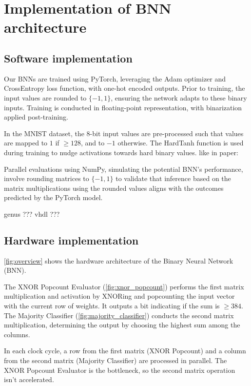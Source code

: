 \documentclass[conference]{IEEEtran}
\newcounter{todocount}
\newcommand{\todo}[1]{
  \stepcounter{todocount}
}
\begin{document}
\section{Implementation of BNN architecture}
\label{sec:implementation}
\subsection{Software implementation}
\todo{list learning rate, batch size}

Our BNNs are trained using PyTorch\cite{paszke2019pytorch}, leveraging the Adam optimizer\cite{kingma2014adam} and CrossEntropy loss function\cite{mao2023crossentropy}, with one-hot encoded outputs. Prior to training, the input values are rounded to \(\{-1, 1\}\), ensuring the network adapts to these binary inputs. Training is conducted in floating-point representation, with binarization applied post-training.

In the MNIST dataset, the 8-bit input values are pre-processed such that values are mapped to $1$ if $\geq 128$, and to $-1$ otherwise. The HardTanh function is used during training to nudge activations towards hard binary values. like in paper: \cite{yuan2023comprehensive}

Parallel evaluations using NumPy, simulating the potential BNN's performance, involve rounding matrices to \(\{-1, 1\}\) to validate that inference based on the matrix multiplications using the rounded values aligns with the outcomes predicted by the PyTorch model.


genus ??? vhdl ???



\subsection{Hardware implementation}

\autoref{fig:overview} shows the hardware architecture of the Binary Neural Network (BNN). 

The XNOR Popcount Evaluator (\autoref{fig:xnor_popcount}) performs the first matrix multiplication and activation by XNORing and popcounting the input vector with the current row of weights. It outputs a bit indicating if the sum is $\geq 384$. The Majority Classifier (\autoref{fig:majority_classifier}) conducts the second matrix multiplication, determining the output by choosing the highest sum among the columns.

In each clock cycle, a row from the first matrix (XNOR Popcount) and a column from the second matrix (Majority Classifier) are processed in parallel. The XNOR Popcount Evaluator is the bottleneck, so the second matrix operation isn't accelerated. 
\end{document}
